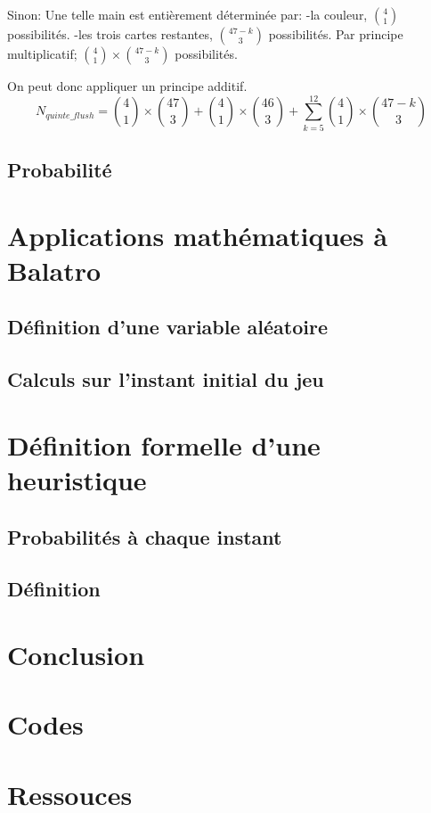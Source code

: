 \documentclass[10pt]{report}
\begin{document}
    Sinon:
    Une telle main est entièrement déterminée par:
    -la couleur, \(\binom{4}{1}\) possibilités.
    -les trois cartes restantes, \(\binom{47 - k}{3}\) possibilités.
    Par principe multiplicatif; $\binom{4}{1} \times \binom{47 - k}{3}$ possibilités.

    On peut donc appliquer un principe additif.
    \[N_{quinte\_flush} = \binom{4}{1} \times \binom{47}{3} + \binom{4}{1} \times \binom{46}{3} + \sum_{k=5}^{12}\binom{4}{1} \times \binom{47 - k}{3} \]
    
    \section{Probabilité}

    \chapter{Applications mathématiques à Balatro}
    \section{Définition d'une variable aléatoire}
    \section{Calculs sur l'instant initial du jeu}

    \chapter{Définition formelle d'une heuristique}
    \section{Probabilités à chaque instant}
    \section{Définition}
    
    \chapter{Conclusion}

    \appendix
    \chapter{Codes}
    \chapter{Ressouces}
\end{document}
